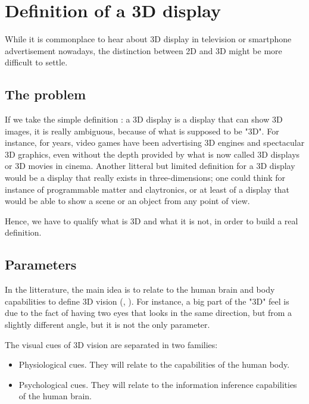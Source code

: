 \section{Definition of a 3D display}
While it is commonplace to hear about 3D display in television or smartphone advertisement nowadays, the distinction between 2D and 3D might be more difficult to settle.
\subsection{The problem}
If we take the simple definition : a 3D display is a display that can show 3D images, it is really ambiguous, because of what is supposed to be "3D". For instance, for years, video games have been advertising 3D engines and spectacular 3D graphics, even without the depth provided by what is now called 3D displays or 3D movies in cinema.
Another litteral but limited definition for a 3D display would be a display that really exists in three-dimensions; one could think for instance of programmable matter and claytronics, or at least of a display that would be able to show a scene or an object from any point of view.

Hence, we have to qualify what is 3D and what it is not, in order to build a real definition.

\subsection{Parameters}
In the litterature, the main idea is to relate to the human brain and body capabilities to define 3D vision (\cite{okoshi1976three}, \cite{pimenta2012comprehensive}). For instance, a big part of the "3D" feel is due to the fact of having two eyes that looks in the same direction, but from a slightly different angle, but it is not the only parameter.

The visual cues of 3D vision are separated in two families:  
\begin{itemize}
\item Physiological cues. They will relate to the capabilities of the human body.
\item Psychological cues. They will relate to the information inference capabilities of the human brain.
\end{itemize}
